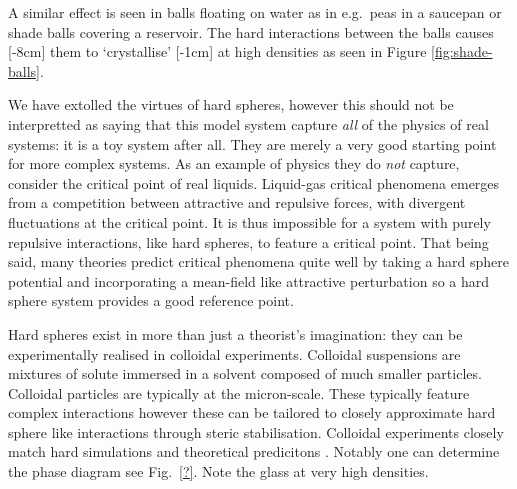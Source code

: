 \documentclass[11pt]{report}
\begin{document}
A similar effect is seen in balls floating on water as in e.g.\ peas in a saucepan or shade balls covering a reservoir.
The hard interactions between the balls causes%
[-8cm]
them to `crystallise'%
[-1cm]
at high densities as seen in Figure \ref{fig:shade-balls}.

We have extolled the virtues of hard spheres, however this should not be interpretted as saying that this model system capture \emph{all} of the physics of real systems: it is a toy system after all.
They are merely a very good starting point for more complex systems.
As an example of physics they do \emph{not} capture, consider the critical point of real liquids.
Liquid-gas critical phenomena emerges from a competition between attractive and repulsive forces, with divergent fluctuations at the critical point.
It is thus impossible for a system with purely repulsive interactions, like hard spheres, to feature a critical point.
That being said, many theories predict critical phenomena quite well by taking a hard sphere potential and incorporating a mean-field like attractive perturbation \cite{?} so a hard sphere system provides a good reference point.

Hard spheres exist in more than just a theorist's imagination: they can be experimentally realised in colloidal experiments.
Colloidal suspensions are mixtures of solute immersed in a solvent composed of much smaller particles.
Colloidal particles are typically at the micron-scale.
These typically feature complex interactions \cite{Royall?,?,?} however these can be tailored to closely approximate hard sphere like interactions through steric stabilisation.
Colloidal experiments closely match hard simulations and theoretical predicitons \cite{?}.
Notably one can determine the phase diagram see Fig.\ \ref{?}.
Note the glass at very high densities.
\end{document}
